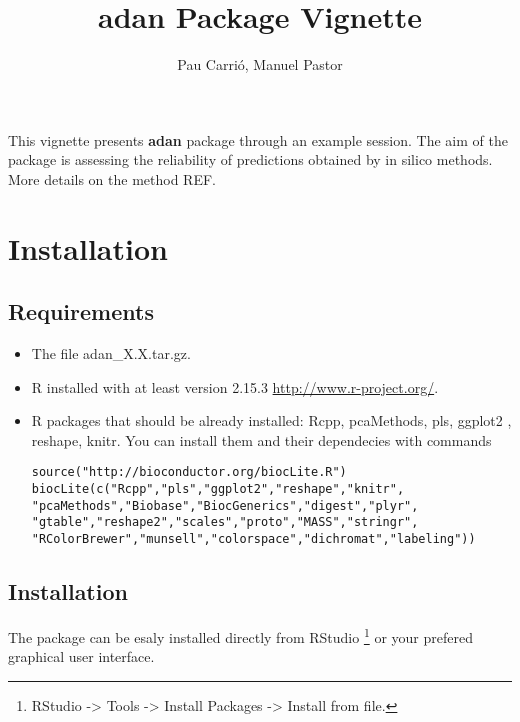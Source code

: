 \documentclass[a4paper]{article}
\begin{document}

%              


\title{adan Package Vignette}
\author{Pau Carri\'{o}, Manuel Pastor}
\maketitle

This vignette presents \textbf{adan} package through an example session. The aim of the package is
 assessing the reliability of predictions obtained by in silico methods. More details on the method REF.

\tableofcontents

\section{Installation}
 
\subsection*{Requirements}
\begin{itemize}
\item The file adan\_X.X.tar.gz.
\item R installed with at least version 2.15.3 \url{http://www.r-project.org/}.
\item R packages that should be already installed: Rcpp, pcaMethods, pls, ggplot2 , reshape, knitr.
You can install them and their dependecies with commands
\begin{verbatim}
source("http://bioconductor.org/biocLite.R")
biocLite(c("Rcpp","pls","ggplot2","reshape","knitr",
"pcaMethods","Biobase","BiocGenerics","digest","plyr",
"gtable","reshape2","scales","proto","MASS","stringr",
"RColorBrewer","munsell","colorspace","dichromat","labeling"))
\end{verbatim}

\end{itemize}
 

\subsection*{Installation}
The package can be esaly installed directly from RStudio \footnote{RStudio -> Tools -> Install Packages -> Install from file.} or your prefered graphical user interface.
\end{document}
